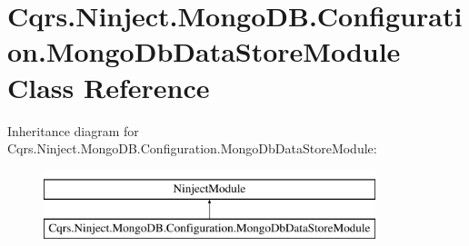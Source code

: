 \hypertarget{classCqrs_1_1Ninject_1_1MongoDB_1_1Configuration_1_1MongoDbDataStoreModule}{}\section{Cqrs.\+Ninject.\+Mongo\+D\+B.\+Configuration.\+Mongo\+Db\+Data\+Store\+Module Class Reference}
\label{classCqrs_1_1Ninject_1_1MongoDB_1_1Configuration_1_1MongoDbDataStoreModule}
Inheritance diagram for Cqrs.\+Ninject.\+Mongo\+D\+B.\+Configuration.\+Mongo\+Db\+Data\+Store\+Module\+:\begin{figure}[H]
\begin{center}
\leavevmode
\includegraphics[height=2.000000cm]{classCqrs_1_1Ninject_1_1MongoDB_1_1Configuration_1_1MongoDbDataStoreModule}
\end{center}
\end{figure}
